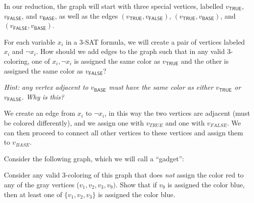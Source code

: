 \documentclass[11pt]{article}
\begin{document}
\noindent In our reduction, the graph will start with three special vertices, labelled $v_{\textsf{TRUE}}$, $v_{\textsf{FALSE}}$, and $v_{\textsf{BASE}}$, as well as the edges $(v_{\textsf{TRUE}}, v_{\textsf{FALSE}})$, $(v_{\textsf{TRUE}}, v_{\textsf{BASE}})$, and $(v_{\textsf{FALSE}}, v_{\textsf{BASE}})$. 
\begin{subparts}

\subpart For each variable $x_i$ in a 3-SAT formula, we will create a
pair of vertices labeled $x_i$ and $\lnot x_i$. How should we add
edges to the graph such that in any valid 3-coloring, one of
$x_i, \lnot x_i$ is assigned the same color as $v_{\textsf{TRUE}}$ and the other is assigned the same color as $v_{\textsf{FALSE}}$? 

\emph{Hint: any vertex adjacent to $v_{\textsf{BASE}}$ must have the same color as either $v_{\textsf{TRUE}}$ or $v_{\textsf{FALSE}}$. Why is this?}\\
\begin{solution}
    We create an edge from $x_i$ to $\lnot x_i$, in this way the two vertices are adjacent (must be colored differently), and we assign one with $v_{TRUE}$ and one with $v_{FALSE}$. We can then proceed
    to connect all other vertices to these vertices and assign them to $v_{BASE}$.
\end{solution}

\subpart Consider the following graph, which we will call a ``gadget'':

\begin{center}
    \end{center}

Consider any valid 3-coloring of this graph that does \textit{not} assign the color red to any of the gray vertices ($v_1, v_2, v_3, v_9)$. Show that if $v_9$ is assigned the color blue, then at least one of $\{v_1, v_2, v_3\}$ is assigned the color blue.


\end{subparts}
\end{document}
